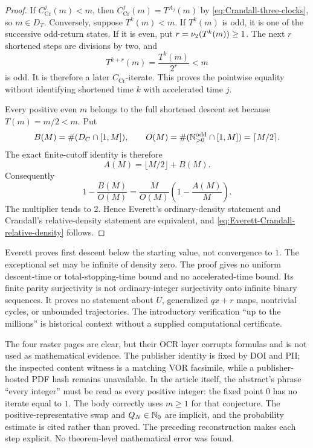 \begin{proof}
If \(C_{\mathrm{Cr}}^j(m)<m\), then
\(C_{\mathrm{Cr}}^j(m)=T^{A_j}(m)\) by
\eqref{eq:Crandall-three-clocks}, so \(m\in D_T\).  Conversely, suppose
\(T^k(m)<m\).  If \(T^k(m)\) is odd, it is one of the successive odd-return
states.  If it is even, put \(r=\nu_{2}(T^k(m))\ge1\).  The next \(r\)
shortened steps are divisions by two, and
\[
 T^{k+r}(m)=\frac{T^k(m)}{2^r}<m
\]
is odd.  It is therefore a later \(C_{\mathrm{Cr}}\)-iterate.  This proves
the pointwise equality without identifying shortened time \(k\) with
accelerated time \(j\).

Every positive even \(m\) belongs to the full shortened descent set because
\(T(m)=m/2<m\).  Put
\[
 B(M)=\#(D_C\cap[1,M]),
 \qquad
 O(M)=\#(\mathbb{N}_{>0}^{\mathrm{odd}}\cap[1,M])=\lceil M/2\rceil.
\]
The exact finite-cutoff identity is therefore
\begin{equation}
\label{eq:Everett-Crandall-finite-count}
 A(M)=\lfloor M/2\rfloor+B(M).
\end{equation}
Consequently
\[
 1-\frac{B(M)}{O(M)}
 =\frac{M}{O(M)}\left(1-\frac{A(M)}M\right).
\]
The multiplier tends to \(2\).  Hence Everett's ordinary-density statement
and Crandall's relative-density statement are equivalent, and
\eqref{eq:Everett-Crandall-relative-density} follows.
\end{proof}

\begin{nonclaim}
Everett proves first descent below the starting value, not convergence to
\(1\).  The exceptional set may be infinite of density zero.  The proof gives
no uniform descent-time or total-stopping-time bound and no accelerated-time
bound.  Its finite parity surjectivity is not ordinary-integer surjectivity
onto infinite binary sequences.  It proves no statement about \(U\),
generalized \(qx+r\) maps, nontrivial cycles, or unbounded trajectories.  The
introductory verification ``up to the millions'' is historical context
without a supplied computational certificate.
\end{nonclaim}

\begin{sourceissue}
\label{sourceissue:Everett-manifestation}
The four raster pages are clear, but their OCR layer corrupts formulas and is
not used as mathematical evidence.  The publisher identity is fixed by DOI
and PII; the inspected content witness is a matching VOR facsimile, while a
publisher-hosted PDF hash remains unavailable.  In the article itself, the
abstract's phrase ``every integer'' must be read as every positive integer:
the fixed point \(0\) has no iterate equal to \(1\).  The body correctly uses
\(m\ge1\) for that conjecture.  The positive-representative swap and
\(Q_N\in\mathbb{N}_{0}\) are implicit, and the probability estimate is cited rather
than proved.  The preceding reconstruction makes each step explicit.  No
theorem-level mathematical error was found.
\end{sourceissue}
